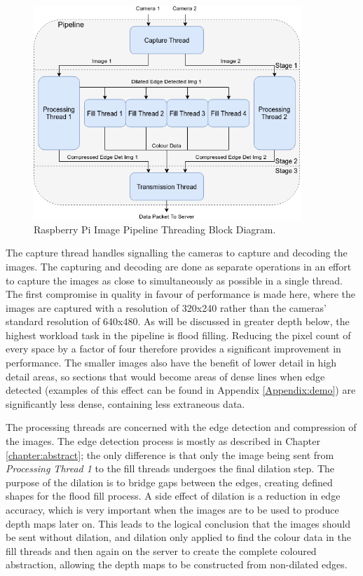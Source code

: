 \begin{figure}[H]
    \begin{center}
      \includegraphics[width=0.9\textwidth]{Figures/Threads.png}
      \caption[Raspberry Pi Image Pipeline Threading Block Diagram]{Raspberry Pi Image Pipeline Threading Block Diagram.}
      \label{fig:threads}
    \end{center}
\end{figure}

The capture thread handles signalling the cameras to capture and decoding the images. The capturing and decoding are done as separate operations in an effort to capture the images as close to simultaneously as possible in a single thread. The first compromise in quality in favour of performance is made here, where the images are captured with a resolution of 320x240 rather than the cameras' standard resolution of 640x480. As will be discussed in greater depth below, the highest workload task in the pipeline is flood filling. Reducing the pixel count of every space by a factor of four therefore provides a significant improvement in performance. The smaller images also have the benefit of lower detail in high detail areas, so sections that would become areas of dense lines when edge detected (examples of this effect can be found in Appendix \ref{Appendix:demo}) are significantly less dense, containing less extraneous data.

The processing threads are concerned with the edge detection and compression of the images. The edge detection process is mostly as described in Chapter \ref{chapter:abstract}; the only difference is that only the image being sent from \emph{Processing Thread 1} to the fill threads undergoes the final dilation step. The purpose of the dilation is to bridge gaps between the edges, creating defined shapes for the flood fill process. A side effect of dilation is a reduction in edge accuracy, which is very important when the images are to be used to produce depth maps later on. This leads to the logical conclusion that the images should be sent without dilation, and dilation only applied to find the colour data in the fill threads and then again on the server to create the complete coloured abstraction, allowing the depth maps to be constructed from non-dilated edges. 

